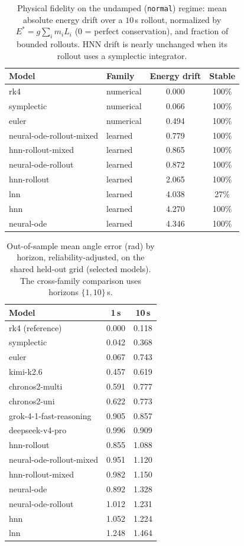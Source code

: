 \documentclass{article}
\begin{document}
\begin{table}[tbp]
\centering\small
\caption{Physical fidelity on the undamped (\texttt{normal}) regime: mean absolute energy
drift over a $10$\,s rollout, normalized by $E^{*}{=}g\sum_i m_i L_i$ (0 = perfect
conservation), and fraction of bounded rollouts. HNN drift is nearly unchanged when its rollout
uses a symplectic integrator.}\label{tab:energy}
\begin{tabular}{llcc}
\toprule
Model & Family & Energy drift & Stable \\
\midrule
rk4 & numerical & 0.000 & 100\% \\
symplectic & numerical & 0.066 & 100\% \\
euler & numerical & 0.494 & 100\% \\
neural-ode-rollout-mixed & learned & 0.779 & 100\% \\
hnn-rollout-mixed & learned & 0.865 & 100\% \\
neural-ode-rollout & learned & 0.872 & 100\% \\
hnn-rollout & learned & 2.065 & 100\% \\
lnn & learned & 4.038 & 27\% \\
hnn & learned & 4.270 & 100\% \\
neural-ode & learned & 4.346 & 100\% \\
\bottomrule
\end{tabular}
\end{table}

\begin{table}[tbp]
\centering\small
\caption{Out-of-sample mean angle error (rad) by horizon, reliability-adjusted, on the
shared held-out grid (selected models). The cross-family comparison uses horizons
$\{1,10\}$\,s.}\label{tab:horizon}
\begin{tabular}{lcc}
\toprule
Model & 1\,s & 10\,s \\
\midrule
rk4 (reference) & 0.000 & 0.118 \\
symplectic & 0.042 & 0.368 \\
euler & 0.067 & 0.743 \\
kimi-k2.6 & 0.457 & 0.619 \\
chronos2-multi & 0.591 & 0.777 \\
chronos2-uni & 0.622 & 0.773 \\
grok-4-1-fast-reasoning & 0.905 & 0.857 \\
deepseek-v4-pro & 0.996 & 0.909 \\
hnn-rollout & 0.855 & 1.088 \\
neural-ode-rollout-mixed & 0.951 & 1.120 \\
hnn-rollout-mixed & 0.982 & 1.150 \\
neural-ode & 0.892 & 1.328 \\
neural-ode-rollout & 1.012 & 1.231 \\
hnn & 1.052 & 1.224 \\
lnn & 1.248 & 1.464 \\
\bottomrule
\end{tabular}
\end{table}
\end{document}
